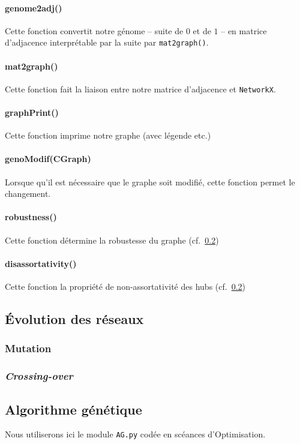 \paragraph*{genome2adj()} Cette fonction convertit notre génome -- suite de $0$ et de $1$ -- en matrice d'adjacence interprétable par la suite par \verb?mat2graph()?.
\paragraph*{mat2graph()} Cette fonction fait la liaison entre notre matrice d'adjacence et \verb?NetworkX?.
\paragraph*{graphPrint()} Cette fonction imprime notre graphe (avec légende etc.)
\paragraph*{genoModif(CGraph)} Lorsque qu'il est nécessaire que le graphe soit modifié, cette fonction permet le changement.
\paragraph*{robustness()} Cette fonction détermine la robustesse du graphe (cf.~\ref{algoG})
\paragraph*{disassortativity()} Cette fonction la propriété de non-assortativité des hubs (cf.~\ref{algoG})


\subsection{Évolution des réseaux}
\subsubsection{Mutation}

\subsubsection{\textit{Crossing-over}}


\subsection{Algorithme génétique}
\label{algoG}
Nous utiliserons ici le module \texttt{AG.py} codée en scéances d'Optimisation. 

